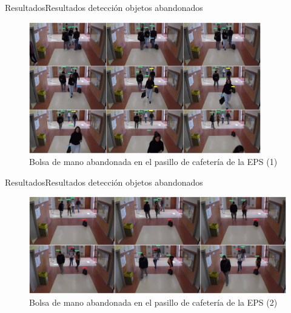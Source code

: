 
\begin{frame}{Resultados}{Resultados detección objetos abandonados}

\begin{figure}[ht]
\centering
\includegraphics[width=0.9\textwidth]{Images/resultados/evaluacion-algoritmos/1.png}
\caption{\label{fig:abandono-uah1}Bolsa de mano abandonada en el pasillo de cafetería de la EPS (1)}
\end{figure}

\end{frame}


\begin{frame}{Resultados}{Resultados detección objetos abandonados}

\begin{figure}[ht]
\centering
\includegraphics[width=1\textwidth]{Images/resultados/evaluacion-algoritmos/2.png}
\caption{\label{fig:abandono-uah2}Bolsa de mano abandonada en el pasillo de cafetería de la EPS (2)}
\end{figure}

\end{frame}